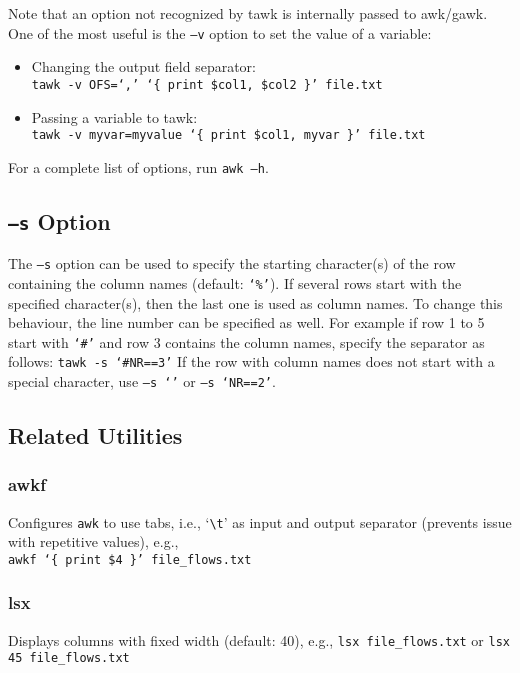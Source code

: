 \documentclass[documentation]{subfiles}
\begin{document}
Note that an option not recognized by tawk is internally passed to awk/gawk.
One of the most useful is the {\tt --v} option to set the value of a variable:
\begin{itemize}
    \item Changing the output field separator:\\
          {\tt tawk -v OFS=`,' `\{ print \$col1, \$col2 \}' file.txt}
    \item Passing a variable to tawk:\\
          {\tt tawk -v myvar=myvalue `\{ print \$col1, myvar \}' file.txt}
\end{itemize}
For a complete list of options, run {\tt awk --h}.


\subsection{{\tt --s} Option}\label{tawk-s-option}
The {\tt --s} option can be used to specify the starting character(s) of the row containing the column names (default: {\tt `\%'}).
If several rows start with the specified character(s), then the last one is used as column names.
To change this behaviour, the line number can be specified as well.
For example if row 1 to 5 start with {\tt `\#'} and row 3 contains the column names, specify the separator as follows: {\tt tawk -s `\#NR==3'}
If the row with column names does not start with a special character, use {\tt --s `'} or {\tt --s `NR==2'}.

\subsection{Related Utilities}

\subsubsection{awkf}\label{awkf}
Configures {\tt awk} to use tabs, i.e., `{\tt\textbackslash{}t}' as input and output separator (prevents issue with repetitive values), e.g.,\\
{\tt awkf `\{ print \$4 \}' file\_flows.txt}

\subsubsection{lsx}
Displays columns with fixed width (default: 40), e.g., {\tt lsx file\_flows.txt} or {\tt lsx 45 file\_flows.txt}
\end{document}

